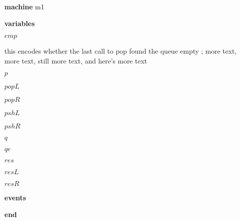 \begin{block}
  \item   \textbf{machine} m1
  \item   \textbf{variables}
  \begin{block}
    \item   $emp$
    \item   \begin{block}
      \item   this encodes whether the last call to pop found the
      queue empty ; more text, more text, still more text, and here's more
      text
    \end{block}
    \item   $p$
    \item   $popL$
    \item   $popR$
    \item   $pshL$
    \item   $pshR$
    \item   $q$
    \item   $qe$
    \item   $res$
    \item   $resL$
    \item   $resR$
  \end{block}
  \item   
  \item   
  \item   \textbf{events}
  \begin{block}
    \item   
    \item   
    \item   
    \item   
    \item   
    \item   
  \end{block}
  \item   \textbf{end} \\
\end{block}
